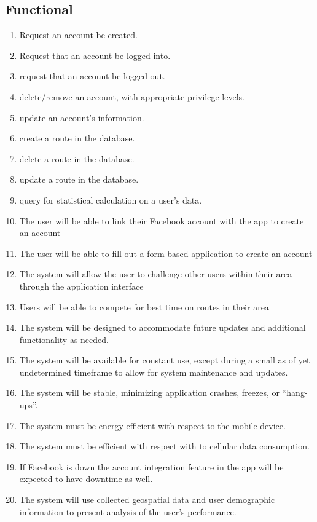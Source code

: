 ﻿\documentclass{article}
\begin{document}
\subsection{Functional}
\begin{enumerate}
    \item Request an account be created.
    \item Request that an account be logged into.
    \item request that an account be logged out.
    \item delete/remove an account, with appropriate privilege levels.
    \item update an account's information.
    \item create a route in the database.
    \item delete a route in the database.
    \item update a route in the database.
    \item query for statistical calculation on a user's data.
    \item The user will be able to link their Facebook account with the app to create an account
    \item The user will be able to fill out a form based application to create an account
    \item The system will allow the user to challenge other users within their area through the application interface
    \item Users will be able to compete for best time on routes in their area
    \item The system will be designed to accommodate future updates and additional functionality as needed.
    \item The system will be available for constant use, except during a small as of yet undetermined timeframe to allow for system maintenance and updates.
    \item The system will be stable, minimizing application crashes, freezes, or “hang-ups”.
    \item The system must be energy efficient with respect to the mobile device.
    \item The system must be efficient with respect with to cellular data consumption.
    \item If Facebook is down the account integration feature in the app will be expected to have downtime as well.
    \item The system will use collected geospatial data and user demographic information to present analysis of the user’s performance.

\end{enumerate}
\end{document}
